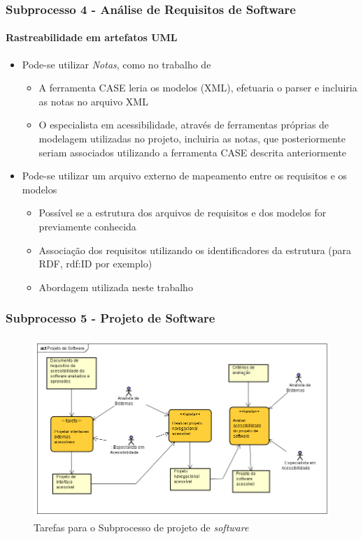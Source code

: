 \documentclass{beamer}
\begin{document}
\begin{frame}
\frametitle{Subprocesso 4 - Análise de Requisitos de Software}
\framesubtitle{Rastreabilidade em artefatos UML}

\begin{itemize}
  \item Pode-se utilizar \textit{Notas}, como no trabalho de \citet{Joonhoon:09}
  \begin{itemize}
    \item A ferramenta CASE leria os modelos (XML), efetuaria o parser e incluiria as notas no arquivo XML
    \item O especialista em acessibilidade, através de ferramentas próprias de modelagem utilizadas no projeto, incluiria as notas, que posteriormente seriam associados utilizando a ferramenta CASE descrita anteriormente
   \end{itemize}
  \item Pode-se utilizar um arquivo externo de mapeamento entre os requisitos e os modelos
  \begin{itemize}
    \item Possível se a estrutura dos arquivos de requisitos e dos modelos for previamente conhecida
    \item Associação dos requisitos utilizando os identificadores da estrutura (para RDF, rdf:ID por exemplo)
    \item Abordagem utilizada neste trabalho
  \end{itemize}
\end{itemize}

\end{frame}

\begin{frame}
\frametitle{Subprocesso 5 - Projeto de Software}
\framesubtitle{}

\begin{figure}[htbp] \centering
	\includegraphics[width=\textwidth,height=.65\textheight,keepaspectratio]{./img/subprocesso5.png}
	\caption{Tarefas para o Subprocesso de projeto de \textit{software} \citep{maia:10}}
	\label{fig:sub5}
\end{figure}

\end{frame}
\end{document}
